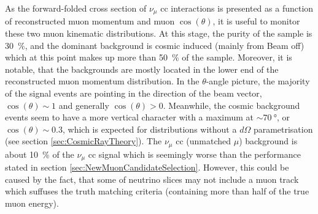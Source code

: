 As the forward-folded cross section of $\nu_{\mu}$ \gls{cc} interactions is presented as a function of reconstructed muon momentum and muon $\cos{(\theta)}$, it is useful to monitor these two muon kinematic distributions. At this stage, the purity of the sample is \SI{30}{\percent}, and the dominant background is cosmic induced (mainly from Beam off) which at this point makes up more than \SI{50}{\percent} of the sample. Moreover, it is notable, that the backgrounds are mostly located in the lower end of the reconstructed muon momentum distribution. In the $\theta$-angle picture, the majority of the signal events are pointing in the direction of the beam vector, \ie $\cos{(\theta)}\sim 1$ and generally $\cos{(\theta)} > 0$. Meanwhile, the cosmic background events seem to have a more vertical character with a maximum at $\sim\SI{70}{\degree}$, or $\cos{(\theta)}\sim \num{0.3}$, which is expected for distributions without a $d\Omega$ parametrisation (see section \ref{sec:CosmicRayTheory}). The $\nu_{\mu}$ \gls{cc} (unmatched $\mu$) background is about \SI{10}{\percent} of the $\nu_{\mu}$ \gls{cc} signal which is seemingly worse than the performance stated in section \ref{sec:NewMuonCandidateSelection}. However, this could be caused by the fact, that some of neutrino slices may not include a muon track which suffuses the truth matching criteria (containing more than half of the true muon energy).

